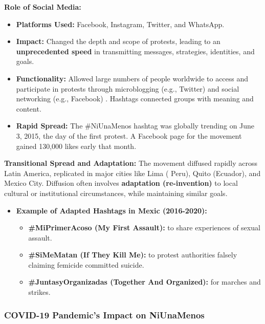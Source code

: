 \documentclass{article}
\begin{document}
    \noindent \textbf{Role of Social Media:}
    \begin{itemize}
        \item \textbf{Platforms Used:} Facebook, Instagram, Twitter, and
        WhatsApp.
        \item \textbf{Impact:} Changed the depth and scope of protests,
        leading to an \textbf{unprecedented speed} in transmitting messages,
        strategies, identities, and goals.
        \item \textbf{Functionality:} Allowed large numbers of people
        worldwide to access and participate in protests through
        microblogging (e.g., Twitter) and social networking (e.g., Facebook)
        . Hashtags connected groups with meaning and content.
        \item \textbf{Rapid Spread:} The \#NiUnaMenos hashtag was globally
        trending on June 3, 2015, the day of the first protest. A Facebook
        page for the movement gained 130,000 likes early that month.
    \end{itemize}

    \noindent \textbf{Transitional Spread and Adaptation:} The movement
diffused rapidly across Latin America, replicated in major cities like Lima (
Peru), Quito (Ecuador), and Mexico City. Diffusion often involves
\textbf{adaptation (re-invention)} to local cultural or institutional
circumstances, while maintaining similar goals.
    \begin{itemize}
        \item \textbf{Example of Adapted Hashtags in Mexic (2016-2020):}
        \begin{itemize}
            \item \textbf{\#MiPrimerAcoso (My First Assault):} to share
            experiences of sexual assault.
            \item \textbf{\#SiMeMatan (If They Kill Me):} to protest
            authorities falsely claiming femicide committed suicide.
            \item \textbf{\#JuntasyOrganizadas (Together And Organized):}
            for marches and strikes.
        \end{itemize}
    \end{itemize}

\subsubsection{COVID-19 Pandemic's Impact on NiUnaMenos}
\end{document}
